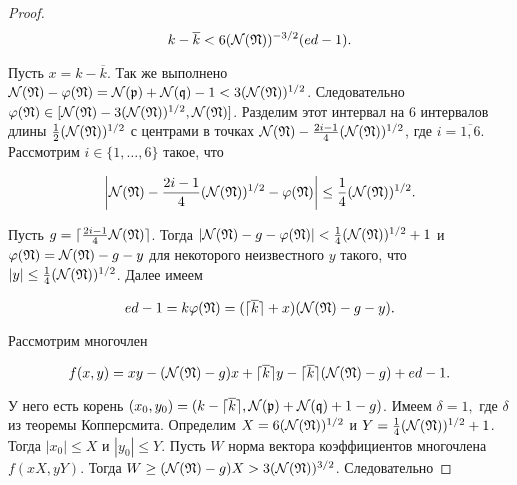\documentclass[_00_dissertation.tex]{subfiles}
\begin{document}
\begin{proof}
    \begin{equation}
        k-\overline{k} < 6(\mathcal{N}(\mathfrak{N}))^{-3/2}(ed-1).
    \end{equation}
  
    Пусть $x=k-\overline{k}$.
    Так же выполнено $\mathcal{N}(\mathfrak{N})-\varphi(\mathfrak{N}) = \mathcal{N}(\mathfrak{p})+\mathcal{N}(\mathfrak{q})-1 < 3(\mathcal{N}(\mathfrak{N}))^{1/2}$.
    Следовательно $\varphi(\mathfrak{N}) \in [\mathcal{N}(\mathfrak{N})-3(\mathcal{N}(\mathfrak{N}))^{1/2}, \mathcal{N}(\mathfrak{N})]$.
    Разделим этот интервал на $6$ интервалов длины $\frac{1}{2}(\mathcal{N}(\mathfrak{N}))^{1/2}$ с центрами в точках $\mathcal{N}(\mathfrak{N})-\frac{2i-1}{4}(\mathcal{N}(\mathfrak{N}))^{1/2}$, где $i=\overline{1,6}$.
    Рассмотрим $i\in \{1,\ldots,6\}$ такое, что

    \begin{equation}
        \left|
            \mathcal{N}(\mathfrak{N})-\frac{2i-1}{4}(\mathcal{N}(\mathfrak{N}))^{1/2}-\varphi(\mathfrak{N})
        \right| \le \frac{1}{4}(\mathcal{N}(\mathfrak{N}))^{1/2}.
    \end{equation}
  
    Пусть $g = \lceil\frac{2i-1}{4}\mathcal{N}(\mathfrak{N})\rceil$.
    Тогда $|\mathcal{N}(\mathfrak{N})-g-\varphi(\mathfrak{N})| < \frac{1}{4}(\mathcal{N}(\mathfrak{N}))^{1/2}+1$ и $\varphi(\mathfrak{N}) = \mathcal{N}(\mathfrak{N})-g-y$ для некоторого неизвестного $y$ такого, что $|y| \le \frac{1}{4}(\mathcal{N}(\mathfrak{N}))^{1/2}$.
    Далее имеем

    \begin{equation}
        ed-1 = k\varphi(\mathfrak{N}) = (\lceil\overline{k}\rceil+x)(\mathcal{N}(\mathfrak{N})-g-y).
    \end{equation}
  
    Рассмотрим многочлен

    \begin{equation}
        f(x,y) = xy-(\mathcal{N}(\mathfrak{N})-g)x+\lceil\overline{k}\rceil y-\lceil\overline{k}\rceil(\mathcal{N}(\mathfrak{N})-g)+ed-1.
    \end{equation}

    У него есть корень $(x_0,y_0) = (k-\lceil\overline{k}\rceil, \mathcal{N}(\mathfrak{p})+\mathcal{N}(\mathfrak{q})+1-g)$.
    Имеем $\delta = 1,$ где $\delta$ из теоремы Копперсмита.
    Определим $X = 6(\mathcal{N}(\mathfrak{N}))^{1/2}$ и $Y = \frac{1}{4}(\mathcal{N}(\mathfrak{N}))^{1/2}+1$.
    Тогда $|x_0| \le X$ и $|y_0| \le Y$.
    Пусть $W$ норма вектора коэффициентов многочлена $f(xX,yY)$.
    Тогда $W \ge (\mathcal{N}(\mathfrak{N})-g)X > 3(\mathcal{N}(\mathfrak{N}))^{3/2}$.
    Следовательно
    

\end{proof}
\end{document}
